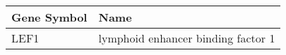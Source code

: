 \begin{tabular}{ll}
\toprule
Gene Symbol &                               Name \\
\midrule
       LEF1 & lymphoid enhancer binding factor 1 \\
\bottomrule
\end{tabular}
